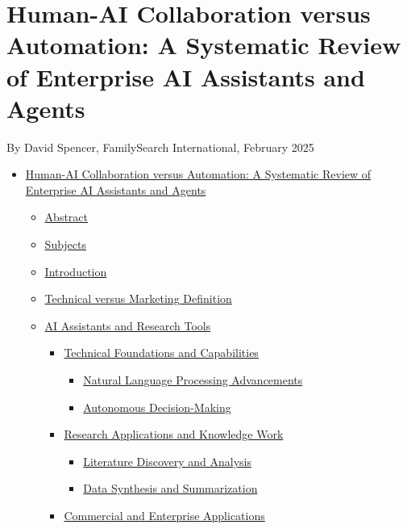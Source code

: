 \documentclass[
]{article}
\author{}
\date{}
\providecommand{\tightlist}{%
  \setlength{\itemsep}{0pt}\setlength{\parskip}{0pt}}
\begin{document}
\section{Human-AI Collaboration versus Automation: A Systematic Review
of Enterprise AI Assistants and
Agents}\label{human-ai-collaboration-versus-automation-a-systematic-review-of-enterprise-ai-assistants-and-agents}

By David Spencer, FamilySearch International, February 2025

\begin{itemize}
\tightlist
\item
  \hyperref[human-ai-collaboration-versus-automation-a-systematic-review-of-enterprise-ai-assistants-and-agents]{Human-AI
  Collaboration versus Automation: A Systematic Review of Enterprise AI
  Assistants and Agents}

  \begin{itemize}
  \tightlist
  \item
    \hyperref[abstract]{Abstract}
  \item
    \hyperref[subjects]{Subjects}
  \item
    \hyperref[introduction]{Introduction}
  \item
    \hyperref[technical-versus-marketing-definition]{Technical versus
    Marketing Definition}
  \item
    \hyperref[ai-assistants-and-research-tools]{AI Assistants and
    Research Tools}

    \begin{itemize}
    \tightlist
    \item
      \hyperref[technical-foundations-and-capabilities]{Technical
      Foundations and Capabilities}

      \begin{itemize}
      \tightlist
      \item
        \hyperref[natural-language-processing-advancements]{Natural
        Language Processing Advancements}
      \item
        \hyperref[autonomous-decision-making]{Autonomous
        Decision-Making}
      \end{itemize}
    \item
      \hyperref[research-applications-and-knowledge-work]{Research
      Applications and Knowledge Work}

      \begin{itemize}
      \tightlist
      \item
        \hyperref[literature-discovery-and-analysis]{Literature
        Discovery and Analysis}
      \item
        \hyperref[data-synthesis-and-summarization]{Data Synthesis and
        Summarization}
      \end{itemize}
    \item
      \hyperref[commercial-and-enterprise-applications]{Commercial and
      Enterprise Applications}


\end{itemize}
\end{itemize}
\end{itemize}
\end{document}
